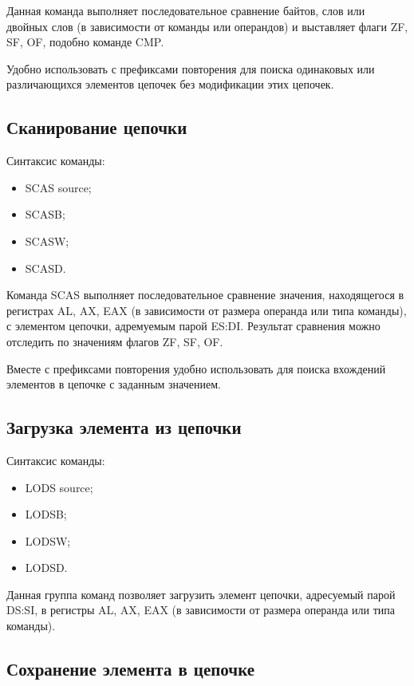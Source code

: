 Данная команда выполняет последовательное сравнение байтов, слов или двойных слов 
(в зависимости от команды или операндов) и выставляет флаги ZF, SF, OF,
подобно команде CMP.

Удобно использовать с префиксами повторения для поиска одинаковых или различающихся 
элементов цепочек без модификации этих цепочек.

\subsection{Сканирование цепочки}

Синтаксис команды:
\begin{itemize}
\item SCAS source;
\item SCASB;
\item SCASW;
\item SCASD.
\end{itemize}

Команда SCAS выполняет последовательное сравнение значения, находящегося
в регистрах AL, AX, EAX (в зависимости от размера операнда или типа команды), 
с элементом цепочки, адремуемым парой ES:DI.
Результат сравнения можно отследить по значениям флагов ZF, SF, OF.

Вместе с префиксами повторения удобно использовать для поиска вхождений
элементов в цепочке с заданным значением.

\subsection{Загрузка элемента из цепочки}

Синтаксис команды:
\begin{itemize}
\item LODS source;
\item LODSB;
\item LODSW;
\item LODSD.
\end{itemize}

Данная группа команд позволяет загрузить элемент цепочки, адресуемый парой DS:SI,
в регистры AL, AX, EAX (в зависимости от размера операнда или типа команды).

\newpage 

\subsection{Сохранение элемента в цепочке}

